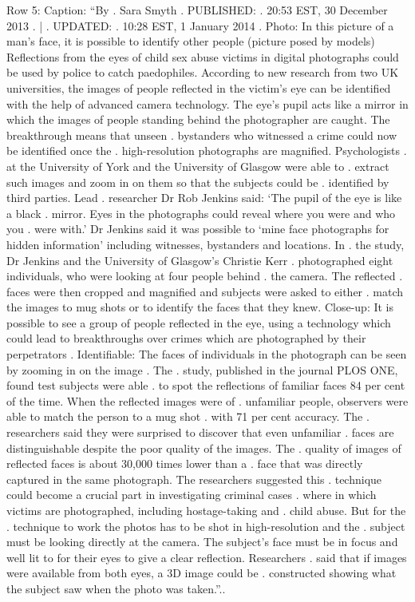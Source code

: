 \begin{table}[H]
\centering
\caption{Row 5\ifshowcaption{}: Caption: ``By . Sara Smyth . PUBLISHED: . 20:53 EST, 30 December 2013 . | . UPDATED: . 10:28 EST, 1 January 2014 . Photo: In this picture of a man's face, it is possible to identify other people (picture posed by models) Reflections from the eyes of child sex abuse victims in digital photographs could be used by police to catch paedophiles. According to new research from two UK universities, the images of people reflected in the victim's eye can be identified with the help of advanced camera technology. The eye's pupil acts like a mirror in which the images of people standing behind the photographer are caught. The breakthrough means that unseen . bystanders who witnessed a crime could now be identified once the . high-resolution photographs are magnified. Psychologists . at the University of York and the University of Glasgow were able to . extract such images and zoom in on them so that the subjects could be . identified by third parties. Lead . researcher Dr Rob Jenkins said: ‘The pupil of the eye is like a black . mirror. Eyes in the photographs could reveal where you were and who you . were with.' Dr Jenkins said it was possible to ‘mine face photographs for hidden information' including witnesses, bystanders and locations. In . the study, Dr Jenkins and the University of Glasgow's Christie Kerr . photographed eight individuals, who were looking at four people behind . the camera. The reflected . faces were then cropped and magnified and subjects were asked to either . match the images to mug shots or to identify the faces that they knew. Close-up: It is possible to see a group of people reflected in the eye, using a technology which could lead to breakthroughs over crimes which are photographed by their perpetrators . Identifiable: The faces of individuals in the photograph can be seen by zooming in on the image . The . study, published in the journal PLOS ONE, found test subjects were able . to spot the reflections of familiar faces 84 per cent of the time. When the reflected images were of . unfamiliar people, observers were able to match the person to a mug shot . with 71 per cent accuracy. The . researchers said they were surprised to discover that even unfamiliar . faces are distinguishable despite the poor quality of the images. The . quality of images of reflected faces is about 30,000 times lower than a . face that was directly captured in the same photograph. The researchers suggested this . technique could become a crucial part in investigating criminal cases . where in which victims are photographed, including hostage-taking and . child abuse. But for the . technique to work the photos has to be shot in high-resolution and the . subject must be looking directly at the camera. The subject's face must be in focus and well lit to for their eyes to give a clear reflection. Researchers . said that if images were available from both eyes, a 3D image could be . constructed showing what the subject saw when the photo was taken.''.\else.}

\end{table}
